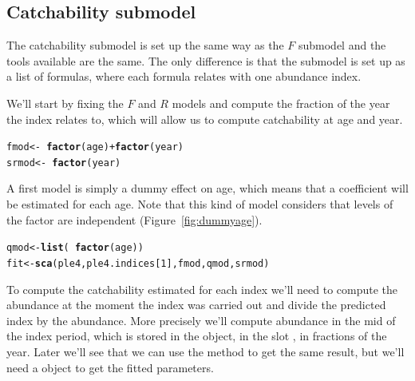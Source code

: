 \documentclass[a4paper,english,10pt]{article}\usepackage[]{graphicx}\usepackage[]{color}
\makeatletter
\newcommand{\hlnum}[1]{\textcolor[rgb]{0.686,0.059,0.569}{#1}}%
\newcommand{\hlopt}[1]{\textcolor[rgb]{0,0,0}{#1}}%
\newcommand{\hlstd}[1]{\textcolor[rgb]{0.345,0.345,0.345}{#1}}%
\newcommand{\hlkwb}[1]{\textcolor[rgb]{0.69,0.353,0.396}{#1}}%
\newcommand{\hlkwd}[1]{\textcolor[rgb]{0.737,0.353,0.396}{\textbf{#1}}}%
\newenvironment{kframe}{%
 \def\at@end@of@kframe{}%
 \ifinner\ifhmode%
  \def\at@end@of@kframe{\end{minipage}}%
  \begin{minipage}{\columnwidth}%
 \fi\fi%
 \def\FrameCommand##1{\hskip\@totalleftmargin \hskip-\fboxsep
 \colorbox{shadecolor}{##1}\hskip-\fboxsep
     \hskip-\linewidth \hskip-\@totalleftmargin \hskip\columnwidth}%
 \MakeFramed {\advance\hsize-\width
   \@totalleftmargin\z@ \linewidth\hsize
   \@setminipage}}%
 {\par\unskip\endMakeFramed%
 \at@end@of@kframe}
\newenvironment{knitrout}{}{} %
\makeatother
\begin{document}
\subsection{Catchability submodel}

The catchability submodel is set up the same way as the $F$ submodel and the tools available are the same. The only difference is that the submodel is set up as a list of formulas, where each formula relates with one abundance index.

We'll start by fixing the $F$ and $R$ models and compute the fraction of the year the index relates to, which will allow us to compute catchability at age and year. 

\begin{knitrout}
\color{fgcolor}\begin{kframe}
\begin{alltt}
\hlstd{fmod} \hlkwb{<-} \hlopt{~}\hlkwd{factor}\hlstd{(age)} \hlopt{+} \hlkwd{factor}\hlstd{(year)}
\hlstd{srmod} \hlkwb{<-} \hlopt{~}\hlkwd{factor}\hlstd{(year)}
\end{alltt}
\end{kframe}
\end{knitrout}

A first model is simply a dummy effect on age, which means that a coefficient will be estimated for each age. Note that this kind of model considers that levels of the factor are independent (Figure~\ref{fig:dummyage}).

\begin{knitrout}
\color{fgcolor}\begin{kframe}
\begin{alltt}
\hlstd{qmod} \hlkwb{<-} \hlkwd{list}\hlstd{(}\hlopt{~}\hlkwd{factor}\hlstd{(age))}
\hlstd{fit} \hlkwb{<-} \hlkwd{sca}\hlstd{(ple4, ple4.indices[}\hlnum{1}\hlstd{], fmod, qmod, srmod)}
\end{alltt}
\end{kframe}
\end{knitrout}

To compute the catchability estimated for each index we'll need to compute the abundance at the moment the index was carried out and divide the predicted index by the abundance. More precisely we'll compute abundance in the mid of the index period, which is stored in the  object, in the slot , in fractions of the year. Later we'll see that we can use the method  to get the same result, but we'll need a  object to get the fitted parameters.
\end{document}

